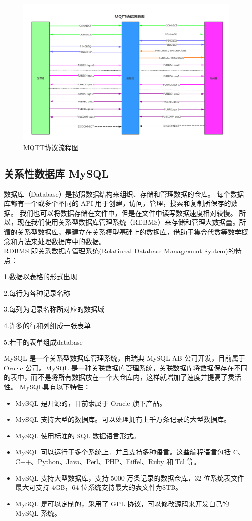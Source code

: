 \begin{figure}[htbp]
	\centering
	\includegraphics[width=1\linewidth]{figure/3-1}
	\caption{MQTT协议流程图}
	\label{fig:3-1}
\end{figure}


\subsection{关系性数据库 MySQL}


数据库（Database）是按照数据结构来组织、存储和管理数据的仓库。
每个数据库都有一个或多个不同的 API 用于创建，访问，管理，搜索和复制所保存的数据。
我们也可以将数据存储在文件中，但是在文件中读写数据速度相对较慢。
所以，现在我们使用关系型数据库管理系统（RDBMS）来存储和管理大数据量。所谓的关系型数据库，是建立在关系模型基础上的数据库，借助于集合代数等数学概念和方法来处理数据库中的数据。
\\RDBMS 即关系数据库管理系统(Relational Database Management System)的特点：

1.数据以表格的形式出现

2.每行为各种记录名称

3.每列为记录名称所对应的数据域

4.许多的行和列组成一张表单

5.若干的表单组成database


MySQL 是一个关系型数据库管理系统，由瑞典 MySQL AB 公司开发，目前属于 Oracle 公司。MySQL 是一种关联数据库管理系统，关联数据库将数据保存在不同的表中，而不是将所有数据放在一个大仓库内，这样就增加了速度并提高了灵活性。
MySQL具有以下特性：
\begin{itemize}
	\item MySQL 是开源的，目前隶属于 Oracle 旗下产品。
	\item MySQL 支持大型的数据库。可以处理拥有上千万条记录的大型数据库。
	\item MySQL 使用标准的 SQL 数据语言形式。
	\item MySQL 可以运行于多个系统上，并且支持多种语言。这些编程语言包括 C、C++、Python、Java、Perl、PHP、Eiffel、Ruby 和 Tcl 等。
	\item MySQL 支持大型数据库，支持 5000 万条记录的数据仓库，32 位系统表文件最大可支持 4GB，64 位系统支持最大的表文件为8TB。
	\item MySQL 是可以定制的，采用了 GPL 协议，可以修改源码来开发自己的 MySQL 系统。
\end{itemize}

